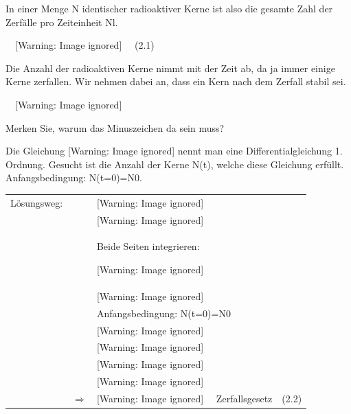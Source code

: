 \documentclass[12pt,a4paper,twoside]{article}
\begin{document}
In einer Menge N identischer radioaktiver Kerne ist also die gesamte Zahl der Zerfälle pro Zeiteinheit N{\textperiodcentered}l.

\ \   [Warning: Image ignored] %
 \ \ (2.1)

Die Anzahl der radioaktiven Kerne nimmt mit der Zeit ab, da ja immer einige Kerne zerfallen. Wir nehmen dabei an, dass ein Kern nach dem Zerfall stabil sei.

\ \   [Warning: Image ignored] %
 

Merken Sie, warum das Minuszeichen da sein muss?

Die Gleichung   [Warning: Image ignored] %
  nennt man eine Differentialgleichung 1. Ordnung. Gesucht ist die Anzahl der Kerne N(t), welche diese Gleichung erfüllt. Anfangsbedingung: N(t=0)=N0.

\begin{flushleft}
\tablefirsthead{}
\tablehead{}
\tabletail{}
\tablelasttail{}
\begin{supertabular}{m{3.8009999cm}m{1.301cm}m{9.801001cm}}
Lösungsweg: &
~
 &
  [Warning: Image ignored] %
 \\
~
 &
~
 &
  [Warning: Image ignored] %
 \\
~
 &
~
 &
Beide Seiten integrieren:

  [Warning: Image ignored] %
 \\
~
 &
~
 &
  [Warning: Image ignored] %
 \\
~
 &
~
 &
Anfangsbedingung: N(t=0)=N0\\
~
 &
~
 &
  [Warning: Image ignored] %
 \\
~
 &
~
 &
  [Warning: Image ignored] %
 \\
~
 &
~
 &
  [Warning: Image ignored] %
 \\
~
 &
~
 &
  [Warning: Image ignored] %
 \\
~
 &
${\Rightarrow}$ &
  [Warning: Image ignored] %
 \ \ Zerfallsgesetz\ \ (2.2)\\
\end{supertabular}
\end{flushleft}
\end{document}
